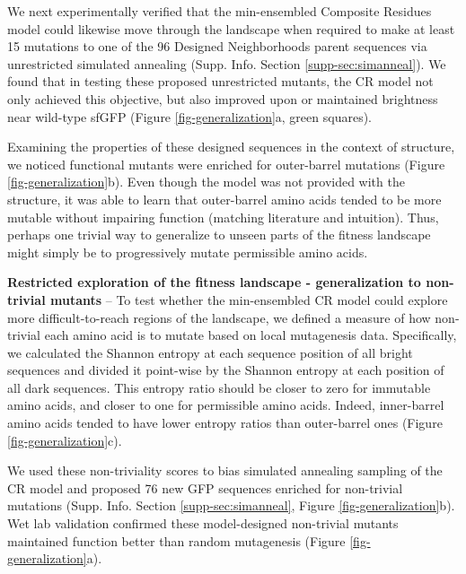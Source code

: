 We next experimentally verified that the min-ensembled Composite Residues model could likewise move through the landscape when required to make at least 15 mutations to one of the 96 Designed Neighborhoods parent sequences via unrestricted simulated annealing (Supp. Info. Section \ref{supp-sec:simanneal}). We found that in testing these proposed unrestricted mutants, the CR model not only achieved this objective, but also improved upon or maintained brightness near wild-type sfGFP (Figure \ref{fig-generalization}a, green squares).

Examining the properties of these designed sequences in the context of structure, we noticed functional mutants were enriched for outer-barrel mutations (Figure \ref{fig-generalization}b). Even though the model was not provided with the structure, it was able to learn that outer-barrel amino acids tended to be more mutable without impairing function (matching literature and intuition). Thus, perhaps one trivial way to generalize to unseen parts of the fitness landscape might simply be to progressively mutate permissible amino acids.

\textbf{Restricted exploration of the fitness landscape - generalization to non-trivial mutants} --
To test whether the min-ensembled CR model could explore more difficult-to-reach regions of the landscape, we defined a measure of how non-trivial each amino acid is to mutate based on local mutagenesis data. Specifically, we calculated the Shannon entropy at each sequence position of all bright sequences and divided it point-wise by the Shannon entropy at each position of all dark sequences. This entropy ratio should be closer to zero for immutable amino acids, and closer to one for permissible amino acids. Indeed, inner-barrel amino acids tended to have lower entropy ratios than outer-barrel ones (Figure \ref{fig-generalization}c).

We used these non-triviality scores to bias simulated annealing sampling of the CR model and proposed 76 new GFP sequences enriched for non-trivial mutations (Supp. Info. Section \ref{supp-sec:simanneal}, Figure \ref{fig-generalization}b). Wet lab validation confirmed these model-designed non-trivial mutants maintained function better than random mutagenesis (Figure \ref{fig-generalization}a).

